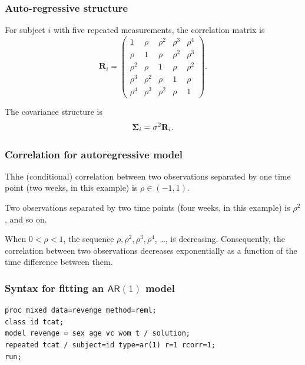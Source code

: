\documentclass{beamer}
\begin{document}
\begin{frame}
\frametitle{Auto-regressive structure}
\bi
\item For subject $i$ with five repeated measurements, 
the correlation matrix is 
\[
\mathbf{R}_i=
  \begin{pmatrix}
   1 & \rho & \rho^2 & \rho^3 & \rho^4\\
    \rho & 1 & \rho & \rho^2 & \rho^3\\
    \rho^2 & \rho & 1 & \rho &  \rho^2\\
       \rho^3 & \rho^2 & \rho & 1 & \rho\\
       \rho^4 & \rho^3 & \rho^2 & \rho & 1
  \end{pmatrix}.
\]
\item The covariance structure is 
\begin{align*}
\boldsymbol {\Sigma}_i=\sigma^2  \mathbf{R}_i.
\end{align*}
\ei
\end{frame}
\begin{frame}
\frametitle{Correlation for autoregressive model}
\bi 
\item Thhe (conditional) correlation between two observations separated by one time point (two weeks, in this example) is $\rho \in (-1,1)$. 
\item Two observations separated by two time points (four weeks, in this example) is $\rho^2$, and so on. 
\item When $0 <\rho<1$, the sequence $\rho, \rho^2, \rho^3, \rho^4$, \ldots, 
is decreasing. Consequently, the correlation between two observations decreases exponentially as a function of the time difference between them.
\ei
\end{frame}

\begin{frame}[fragile]
\frametitle{Syntax for fitting an $\mathsf{AR}(1)$ model}
\begin{tcolorbox}[colback=white, colframe=hecblue, title=\SASlang{} code to fit an $\mathsf{AR}(1)$ model]
\begin{verbatim}
proc mixed data=revenge method=reml;
class id tcat;
model revenge = sex age vc wom t / solution;
repeated tcat / subject=id type=ar(1) r=1 rcorr=1;
run;
\end{verbatim}
\end{tcolorbox}

\end{frame}
\end{document}
